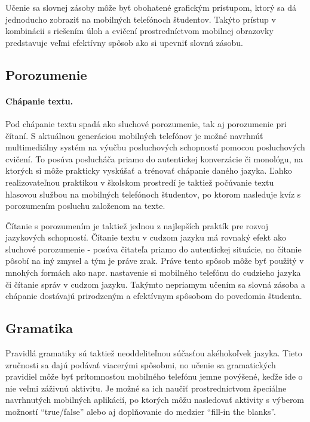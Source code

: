 \documentclass[10pt,oneside,slovak,a4paper]{article}
\begin{document}
Učenie sa slovnej zásoby môže byť obohatené grafickým prístupom, ktorý sa dá jednoducho zobraziť na mobilných telefónoch študentov. Takýto prístup v kombinácii s riešením úloh a cvičení prostredníctvom mobilnej obrazovky predstavuje veľmi efektívny spôsob ako si upevniť slovnú zásobu.

\subsection{Porozumenie} \label{mall:porozumenie}

\paragraph{Chápanie textu.}
Pod chápanie textu spadá ako sluchové porozumenie, tak aj porozumenie pri čítaní. S aktuálnou generáciou mobilných telefónov je možné navrhnúť multimediálny systém na výučbu posluchových schopností pomocou posluchových cvičení\cite{Miangah2012}. To posúva poslucháča priamo do autentickej konverzácie či monológu, na ktorých si môže prakticky vyskúšať a trénovať chápanie daného jazyka. Ľahko realizovateľnou praktikou v školskom prostredí je taktiež počúvanie textu hlasovou službou na mobilných telefónoch študentov, po ktorom nasleduje kvíz s porozumením posluchu založenom na texte.

Čítanie s porozumením je taktiež jednou z najlepších praktík pre rozvoj jazykových schopností. Čítanie textu v cudzom jazyku má rovnaký efekt ako sluchové porozumenie - posúva čitateľa priamo do autentickej situácie, no čítanie pôsobí na iný zmysel a tým je práve zrak. Práve tento spôsob môže byť použitý v mnohých formách ako napr. nastavenie si mobilného telefónu do cudzieho jazyka či čítanie správ v cudzom jazyku. Takýmto nepriamym učením sa slovná zásoba a chápanie dostávajú prirodzeným a efektívnym spôsobom do povedomia študenta.

\subsection{Gramatika} \label{mall:gramatika}

Pravidlá gramatiky sú taktiež neoddeliteľnou súčasťou akéhokoľvek jazyka. Tieto zručnosti sa dajú podávať viacerými spôsobmi, no učenie sa gramatických pravidiel môže byť prítomnosťou mobilného telefónu jemne povýšené, keďže ide o nie veľmi záživnú aktivitu. Je možné sa ich naučiť prostredníctvom špeciálne navrhnutých mobilných aplikácií, po ktorých môžu nasledovať aktivity s výberom možností \enquote{true/false} alebo aj doplňovanie do medzier \enquote{fill-in the blanks}. 
\end{document}
